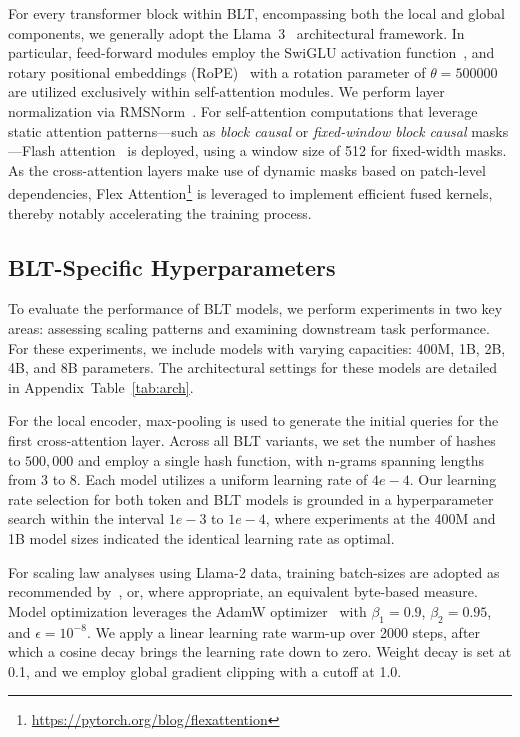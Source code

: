For every transformer block within {\textsc BLT}, encompassing both the local and global components, we generally adopt the Llama~3~\citep{dubey2024llama} architectural framework. In particular, feed-forward modules employ the SwiGLU activation function~\citep{swiglu}, and rotary positional embeddings (RoPE)~\citep{RoPe} with a rotation parameter of $\theta=500000$~\citep{xiong2024effective} are utilized exclusively within self-attention modules. We perform layer normalization via RMSNorm~\citep{RMSNorm}. For self-attention computations that leverage static attention patterns—such as \textit{block causal} or \textit{fixed-window block causal} masks—Flash attention~\citep{dao2022flashattention} is deployed, using a window size of 512 for fixed-width masks. As the cross-attention layers make use of dynamic masks based on patch-level dependencies, Flex Attention\footnote{\url{https://pytorch.org/blog/flexattention}} is leveraged to implement efficient fused kernels, thereby notably accelerating the training process.

\subsection{{\textsc BLT}-Specific Hyperparameters} 

To evaluate the performance of {\textsc BLT} models, we perform experiments in two key areas: assessing scaling patterns and examining downstream task performance. For these experiments, we include models with varying capacities: 400M, 1B, 2B, 4B, and 8B parameters. The architectural settings for these models are detailed in Appendix~Table~\ref{tab:arch}.

For the local encoder, max-pooling is used to generate the initial queries for the first cross-attention layer. Across all {\textsc BLT} variants, we set the number of hashes to $500,000$ and employ a single hash function, with n-grams spanning lengths from 3 to 8. Each model utilizes a uniform learning rate of $4e-4$. Our learning rate selection for both token and {\textsc BLT} models is grounded in a hyperparameter search within the interval $1e-3$ to $1e-4$, where experiments at the 400M and 1B model sizes indicated the identical learning rate as optimal.

For scaling law analyses using Llama-2 data, training batch-sizes are adopted as recommended by~\cite{dubey2024llama}, or, where appropriate, an equivalent byte-based measure. Model optimization leverages the AdamW optimizer~\citep{adamw} with $\beta_1 = 0.9$, $\beta_2 = 0.95$, and $\epsilon = 10^{-8}$. We apply a linear learning rate warm-up over 2000 steps, after which a cosine decay brings the learning rate down to zero. Weight decay is set at 0.1, and we employ global gradient clipping with a cutoff at 1.0.

